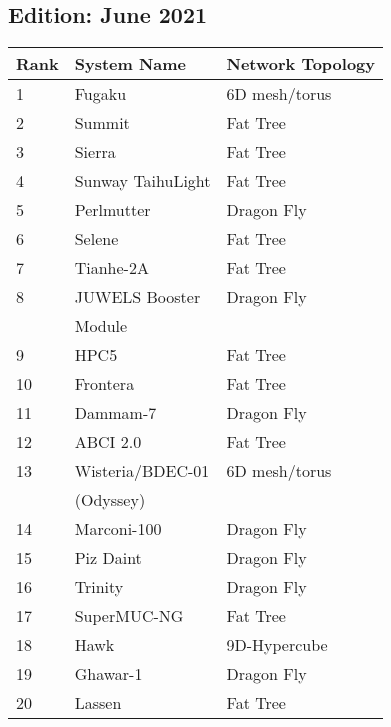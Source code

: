 \documentclass{article}
\begin{document}
\vfill
\begin{minipage}{0.45\textwidth}
\subsection{Edition: June 2021}
\label{sec:edition:-june-2021}
\begin{tabular}[H]{||l|l|l||} \hline\hline
  Rank & System Name       & Network Topology \\ \hline\hline
  1    & Fugaku            & 6D mesh/torus    \\ \hline
  2    & Summit            & Fat Tree         \\ \hline
  3    & Sierra            & Fat Tree         \\ \hline
  4    & Sunway TaihuLight & Fat Tree         \\ \hline
  5    & Perlmutter        & Dragon Fly       \\ \hline
  6    & Selene            & Fat Tree         \\ \hline
  7    & Tianhe-2A         & Fat Tree         \\ \hline
  8    & JUWELS Booster    & Dragon Fly       \\
       & Module            &                  \\ \hline
  9    & HPC5              & Fat Tree         \\ \hline
  10   & Frontera          & Fat Tree         \\ \hline
  11   & Dammam-7          & Dragon Fly       \\ \hline
  12   & ABCI 2.0          & Fat Tree         \\ \hline
  13   & Wisteria/BDEC-01  & 6D mesh/torus    \\ 
       & (Odyssey)         &                  \\ \hline
  14   & Marconi-100       & Dragon Fly       \\ \hline
  15   & Piz Daint         & Dragon Fly       \\ \hline
  16   & Trinity           & Dragon Fly       \\ \hline
  17   & SuperMUC-NG       & Fat Tree         \\ \hline
  18   & Hawk              & 9D-Hypercube     \\ \hline
  19   & Ghawar-1          & Dragon Fly       \\ \hline
  20   & Lassen            & Fat Tree         \\ \hline\hline
\end{tabular}
\end{minipage}
\end{document}
